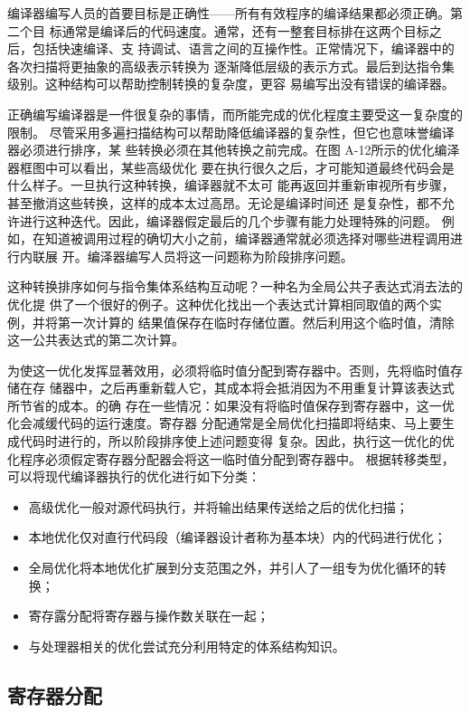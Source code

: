编译器编写人员的首要目标是正确性——所有有效程序的编译结果都必须正确。第二个目
标通常是编译后的代码速度。通常，还有一整套目标排在这两个目标之后，包括快速编译、支
持调试、语言之间的互操作性。正常情况下，编译器中的各次扫描将更抽象的高级表示转换为
逐渐降低层级的表示方式。最后到达指令集级别。这种结构可以帮助控制转换的复杂度，更容
易编写出没有错误的编译器。

正确编写编译器是一件很复杂的事情，而所能完成的优化程度主要受这一复杂度的限制。
尽管采用多遍扫描结构可以帮助降低编译器的复杂性，但它也意味誉编译器必须进行排序，某
些转换必须在其他转换之前完成。在图 A-12所示的优化编泽器框图中可以看出，某些高级优化
要在执行很久之后，才可能知道最终代码会是什么样子。一旦执行这种转换，编译器就不太可
能再返回并重新审视所有步骤，甚至撤消这些转换，这样的成本太过高昂。无论是编译时间还
是复杂性，都不允许进行这种迭代。因此，编译器假定最后的几个步骤有能力处理特殊的问题。
例如，在知道被调用过程的确切大小之前，编译器通常就必须选择对哪些进程调用进行内联展
开。编泽器编写人员将这一问题称为阶段排序问题。

这种转换排序如何与指令集体系结构互动呢？一种名为全局公共子表达式消去法的优化提
供了一个很好的例子。这种优化找出一个表达式计算相同取值的两个实例，并将第一次计算的
结果值保存在临时存储位置。然后利用这个临时值，清除这一公共表达式的第二次计算。

为使这一优化发挥显著效用，必须将临时值分配到寄存器中。否则，先将临时值存储在存
储器中，之后再重新载人它，其成本将会抵消因为不用重复计算该表达式所节省的成本。的确
存在一些情况：如果没有将临时值保存到寄存器中，这一优化会减缓代码的运行速度。寄存器
分配通常是全局优化扫描即将结束、马上要生成代码时进行的，所以阶段排序使上述问题变得
复杂。因此，执行这一优化的优化程序必须假定寄存器分配器会将这一临时值分配到寄存器中。
根据转移类型，可以将现代编译器执行的优化进行如下分类：

\begin{itemize}
    \item 高级优化一般对源代码执行，并将输出结果传送给之后的优化扫描；
    \item 本地优化仅对直行代码段（编译器设计者称为基本块）内的代码进行优化；
    \item 全局优化将本地优化扩展到分支范围之外，并引人了一组专为优化循环的转换；
    \item 寄存露分配将寄存器与操作数关联在一起；
    \item 与处理器相关的优化尝试充分利用特定的体系结构知识。
\end{itemize}

\subsection{寄存器分配}

